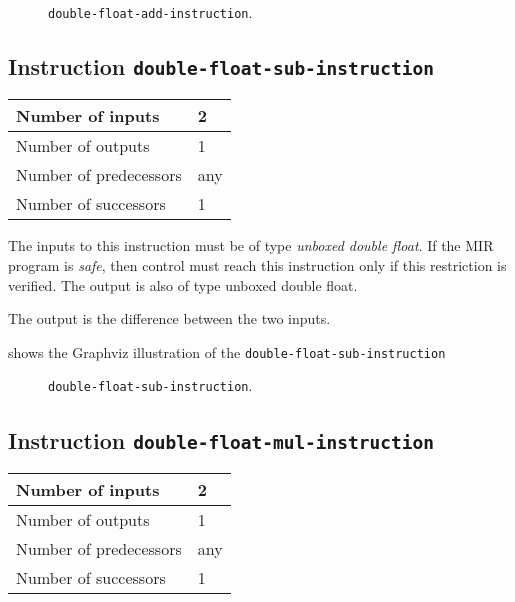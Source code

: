 \begin{figure}
\begin{center}
\end{center}
\caption{\label{fig-double-float-add-instruction}
\texttt{double-float-add-instruction}.}
\end{figure}

\subsection{Instruction \texttt{double-float-sub-instruction}}
\label{mir-instruction-double-float-sub}

\begin{tabular}{|l|l|}
\hline
Number of inputs & 2\\
\hline
Number of outputs & 1\\
\hline
Number of predecessors & any\\
\hline
Number of successors & 1\\
\hline
\end{tabular}

The inputs to this instruction must be of type \emph{unboxed double
  float}.  If the MIR program is \emph{safe}, then control must reach
this instruction only if this restriction is verified.  The output is
also of type unboxed double float.

The output is the difference between the two inputs.

 shows the Graphviz illustration of the
\texttt{double-float-sub-instruction}

\begin{figure}
\begin{center}
\end{center}
\caption{\label{fig-double-float-sub-instruction}
\texttt{double-float-sub-instruction}.}
\end{figure}

\subsection{Instruction \texttt{double-float-mul-instruction}}
\label{mir-instruction-double-float-mul}

\begin{tabular}{|l|l|}
\hline
Number of inputs & 2\\
\hline
Number of outputs & 1\\
\hline
Number of predecessors & any\\
\hline
Number of successors & 1\\
\hline
\end{tabular}

